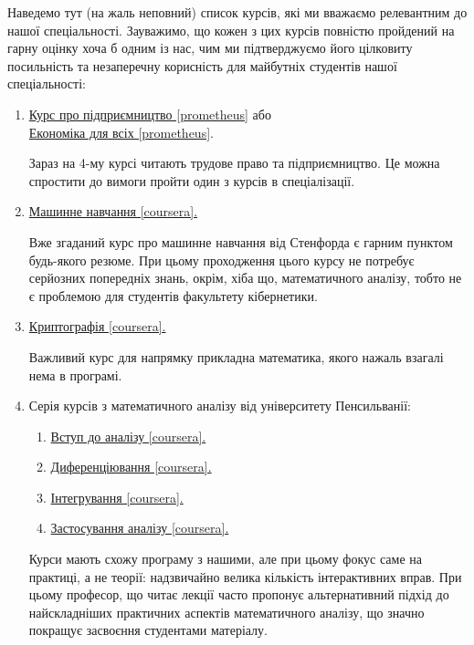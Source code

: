 \documentclass[14pt, a4paper]{extarticle}  %
\begin{document}
Наведемо тут (на жаль неповний) список курсів, які ми вважаємо релевантним до нашої спеціальності. Зауважимо, що кожен з цих курсів повністю пройдений на гарну оцінку хоча б одним із нас, чим ми підтверджуємо його цілковиту посильність та незаперечну корисність для майбутніх студентів нашої спеціальності:
\begin{enumerate}
    \item \href{https://prometheus.org.ua/entrepreneurship/}{Курс про підприємництво [prometheus]} або \\ \href{https://edx.prometheus.org.ua/courses/NaUKMA/103/2015_T1/about}{Економіка для всіх [prometheus]}.
    
    Зараз на 4-му курсі читають трудове право та підприємництво. Це можна спростити до вимоги пройти один з курсів в спеціалізації.
    
    \item \href{https://www.coursera.org/learn/machine-learning}{Машинне навчання [coursera].}
    
    Вже згаданий курс про машинне навчання від Стенфорда є гарним пунктом будь-якого резюме. При цьому проходження цього курсу не потребує серйозних попередніх знань, окрім, хіба що, математичного аналізу, тобто не є проблемою для студентів факультету кібернетики.
    
    \item \href{https://www.coursera.org/learn/crypto}{Криптографія [coursera].}
    
    Важливий курс для напрямку прикладна математика, якого нажаль взагалі нема в програмі.
    
    \item Серія курсів з математичного аналізу від університету Пенсильванії:
	\begin{enumerate}
		\item \href{https://www.coursera.org/learn/single-variable-calculus/home/welcome}{Вступ до аналізу [coursera].}
		\item \href{https://www.coursera.org/learn/differentiation-calculus/home/welcome}{Диференціювання [coursera].}
		\item \href{https://www.coursera.org/learn/integration-calculus/home/welcome}{Інтегрування [coursera].}
		\item \href{https://www.coursera.org/learn/applications-calculus/home/welcome}{Застосування аналізу [coursera].}
	\end{enumerate}
    
    Курси мають схожу програму з нашими, але при цьому фокус саме на практиці, а не теорії: надзвичайно велика кількість інтерактивних вправ. При цьому професор, що читає лекції часто пропонує альтернативний підхід до найскладніших практичних аспектів математичного аналізу, що значно покращує засвоєння студентами матеріалу.


\end{enumerate}
\end{document}
